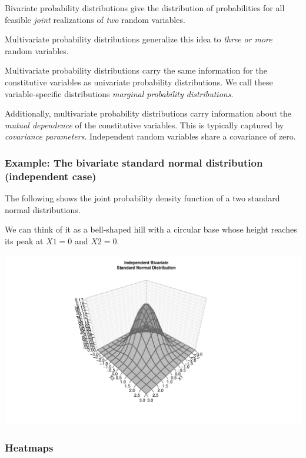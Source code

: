 \documentclass[
  11pt,
]{article}
\begin{document}
Bivariate probability distributions give the distribution of probabilities for all feasible \emph{joint} realizations of \emph{two} random variables.

Multivariate probability distributions generalize this idea to \emph{three or more} random variables.

Multivariate probability distributions carry the same information for the constitutive variables as univariate probability distributions. We call these variable-specific distributions \emph{marginal probability distributions}.

Additionally, multivariate probability distributions carry information about the \emph{mutual dependence} of the constitutive variables. This is typically captured by \emph{covariance parameters}. Independent random variables share a covariance of zero.

\hypertarget{example-the-bivariate-standard-normal-distribution-independent-case}{%
\subsubsection{Example: The bivariate standard normal distribution (independent case)}\label{example-the-bivariate-standard-normal-distribution-independent-case}}

The following shows the joint probability density function of a two standard normal distributions.

We can think of it as a bell-shaped hill with a circular base whose height reaches its peak at \(X1 = 0\) and \(X2 = 0\).

\begin{flushleft}\includegraphics{01-01-lec_files/figure-latex/bvnnorm-1-1} \end{flushleft}

\hypertarget{heatmaps}{%
\subsubsection{Heatmaps}\label{heatmaps}}
\end{document}
